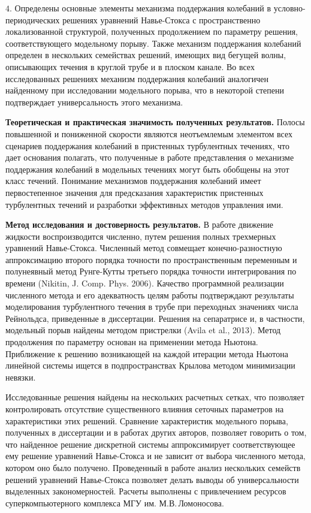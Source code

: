 \noindent $4.$ Определены основные элементы механизма поддержания колебаний в условно-периодических решениях уравнений Навье-Стокса с пространственно локализованной структурой, полученных продолжением по параметру решения, соответствующего модельному порыву. Также механизм поддержания колебаний определен в нескольких семействах решений, имеющих вид бегущей волны, описывающих течения в круглой трубе и в плоском канале. Во всех исследованных решениях механизм поддержания колебаний аналогичен найденному при исследовании модельного порыва, что в некоторой степени подтверждает универсальность этого механизма. 

{\bf Теоретическая и практическая значимость полученных результатов.}
Полосы повышенной и пониженной скорости являются неотъемлемым элементом всех сценариев поддержания колебаний в пристенных турбулентных течениях, что дает основания полагать, что полученные в работе представления о механизме поддержания колебаний в модельных течениях могут быть обобщены на этот класс течений. Понимание механизмов поддержания колебаний имеет первостепенное значения для предсказания характеристик пристенных турбулентных течений и разработки эффективных методов управления ими.

\textbf{Метод исследования и достоверность результатов.}
В работе движение жидкости воспроизводится численно, путем решения полных трехмерных уравнений Навье-Стокса. Численный метод совмещает конечно-разностную аппроксимацию второго порядка точности по пространственным переменным и полунеявный метод Рунге-Кутты третьего порядка точности интегрирования по времени (Nikitin, J. Comp. Phys. 2006). Качество программной реализации численного метода и его адекватность целям работы подтверждают результаты моделирования турбулентного течения в трубе при переходных значениях числа Рейнольдса, приведенные в диссертации. Решения на сепаратрисе и, в частности, модельный порыв найдены методом пристрелки (Avila et al., 2013). Метод продолжения по параметру основан на применении метода Ньютона. Приближение к решению возникающей на каждой итерации метода Ньютона линейной системы ищется в подпространствах Крылова методом минимизации невязки.

Исследованные решения найдены на нескольких расчетных сетках, что позволяет контролировать отсутствие существенного влияния сеточных параметров на характеристики этих решений. Сравнение характеристик модельного порыва, полученных в диссертации и в работах других авторов, позволяет говорить о том, что найденное решение дискретной системы аппроксимирует соответствующее ему решение уравнений Навье-Стокса и не зависит от выбора численного метода, котором оно было получено. Проведенный в работе анализ нескольких семейств решений уравнений Навье-Стокса позволяет делать выводы об универсальности выделенных закономерностей. Расчеты выполнены с привлечением ресурсов суперкомпьютерного комплекса МГУ им. М.В.\,Ломоносова.

